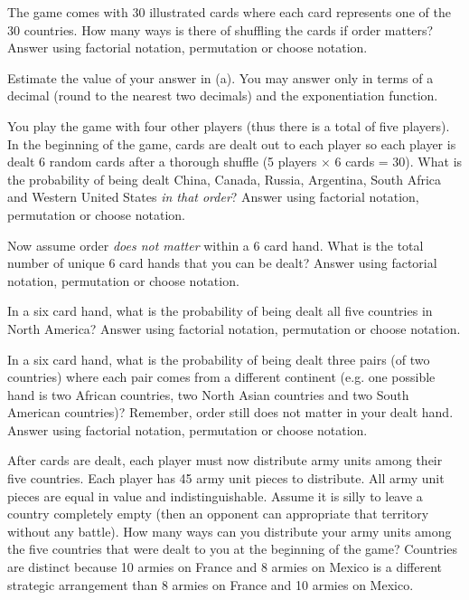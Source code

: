 \documentclass[12pt]{article}
\begin{document}
\benum
{} The game comes with 30 illustrated cards where each card represents one of the 30 countries. How many ways is there of shuffling the cards if order matters? Answer using factorial notation, permutation or choose notation.

 Estimate the value of your answer in (a). You may answer only in terms of a decimal (round to the nearest two decimals) and the exponentiation function. 

 You play the game with four other players (thus there is a total of five players). In the beginning of the game, cards are dealt out to each player so each player is dealt 6 random cards after a thorough shuffle (5 players $\times$ 6 cards = 30). What is the probability of being dealt China, Canada, Russia, Argentina, South Africa and Western United States \textit{in that order}? Answer using factorial notation, permutation or choose notation.


 Now assume order \textit{does not matter} within a 6 card hand. What is the total number of unique 6 card hands that you can be dealt? Answer using factorial notation, permutation or choose notation.

 In a six card hand, what is the probability of being dealt all five countries in North America? Answer using factorial notation, permutation or choose notation.

 In a six card hand, what is the probability of being dealt three pairs (of two countries) where each pair comes from a different  continent (e.g. one possible hand is two African countries, two North Asian countries and two South American countries)? Remember, order still does not matter in your dealt hand. Answer using factorial notation, permutation or choose notation.

 After cards are dealt, each player must now distribute army units among their five countries. Each player has 45 army unit pieces to distribute. All army unit pieces are equal in value and indistinguishable. Assume it is silly to leave a country completely empty (then an opponent can appropriate that territory without any battle). How many ways can you distribute your army units among the five countries that were dealt to you at the beginning of the game? Countries are distinct because 10 armies on France and 8 armies on Mexico is a different strategic arrangement than 8 armies on France and 10 armies on Mexico. 
\end{document}
